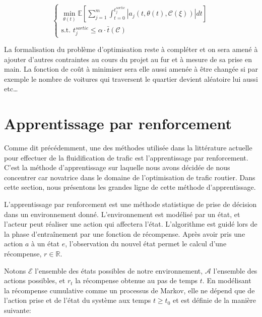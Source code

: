\documentclass[11pt]{article}
\begin{document}
\begin{latex}
\begin{equation}
\begin{cases}
\displaystyle{\min_{\theta(t)}{\mathbb{E}\left [\sum_{j=1}^{m} \int_{t = 0}^{t^{sortie}_{j}}{ | a_{j}(t,\theta(t),\mathcal{C}(\xi)) | dt} \right ]}}\\
\text{s.t.~} t^{sortie}_{j} \leq \alpha \cdot \bar{t}(\mathcal{C})
\end{cases}
\end{equation}
\end{latex}

La formalisation du problème d'optimisation reste à compléter et on sera amené à ajouter d'autres contraintes au cours du projet au fur et à mesure de sa prise en main. La fonction de coût à minimiser sera elle aussi amenée à être changée si par exemple le nombre de voitures qui traversent le quartier devient aléatoire lui aussi etc\ldots{}

\section{Apprentissage par renforcement}
\label{sec:orgf8c3b29}

Comme dit précédemment, une des méthodes utilisée dans la littérature actuelle pour effectuer de la fluidification de trafic est l'apprentissage par renforcement. C'est la méthode d'apprentissage sur laquelle nous avons décidée de nous concentrer car novatrice dans le domaine de l'optimisation de trafic routier. Dans cette section, nous présentons les grandes ligne de cette méthode d'apprentissage.

L'apprentissage par renforcement est une méthode statistique de prise de décision dans un environnement donné. L'environnement est modélisé par un état, et l'acteur peut réaliser une action qui affectera l'état. L'algorithme est guidé lors de la phase d'entraînement par une fonction de récompense. Après avoir pris une action \(a\) à un état \(e\), l'observation du nouvel état permet le calcul d'une récompense, \(r \in \mathbb{R}\).

Notons \(\mathcal{E}\) l'ensemble des états possibles de notre environnement, \(\mathcal{A}\) l'ensemble des actions possibles, et \(r_t\) la récompense obtenue au pas de temps \(t\). En modélisant la récompense cumulative comme un processus de Markov, elle ne dépend que de l'action prise et de l'état du système aux temps \(t \geq t_0\) et est définie de la manière suivante:
\end{document}
